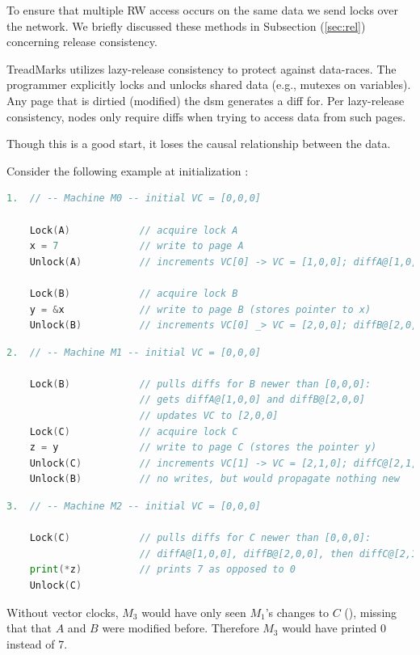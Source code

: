 \newpage
\noindent
To ensure that multiple RW access occurs on the same data we send locks over the network.
We briefly discussed these methods in Subsection (\ref{sec:rel}) concerning release consistency.
\begin{Def}

    TreadMarks utilizes lazy-release consistency to protect against data-races.
    The programmer explicitly locks and unlocks shared data (e.g., mutexes on variables).
    Any page that is dirtied (modified) the dsm generates a diff for. Per lazy-release consistency,
    nodes only require diffs when trying to access data from such pages.
\end{Def}

\noindent
Though this is a good start, it loses the causal relationship between the data.
\begin{Example}

    Consider the following example at initialization :
    \begin{lstlisting}[language=Go, numbers=none]
1.  // -- Machine M0 -- initial VC = [0,0,0]

    Lock(A)            // acquire lock A
    x = 7              // write to page A
    Unlock(A)          // increments VC[0] -> VC = [1,0,0]; diffA@[1,0,0]

    Lock(B)            // acquire lock B
    y = &x             // write to page B (stores pointer to x)
    Unlock(B)          // increments VC[0] _> VC = [2,0,0]; diffB@[2,0,0]

    \end{lstlisting}

    \begin{lstlisting}[language=Go, numbers=none]
2.  // -- Machine M1 -- initial VC = [0,0,0]

    Lock(B)            // pulls diffs for B newer than [0,0,0]:
                       // gets diffA@[1,0,0] and diffB@[2,0,0]
                       // updates VC to [2,0,0]
    Lock(C)            // acquire lock C
    z = y              // write to page C (stores the pointer y)
    Unlock(C)          // increments VC[1] -> VC = [2,1,0]; diffC@[2,1,0]
    Unlock(B)          // no writes, but would propagate nothing new
    \end{lstlisting}

    \begin{lstlisting}[language=Go, numbers=none]
3.  // -- Machine M2 -- initial VC = [0,0,0]
    
    Lock(C)            // pulls diffs for C newer than [0,0,0]:
                       // diffA@[1,0,0], diffB@[2,0,0], then diffC@[2,1,0]
    print(*z)          // prints 7 as opposed to 0
    Unlock(C)          
    \end{lstlisting}
    \noindent
    Without vector clocks, $M_3$ would have only seen $M_1$'s changes to $C$ (), missing that 
    that $A$ and $B$ were modified before. Therefore $M_3$ would have printed 0 instead of 7.
\end{Example}

